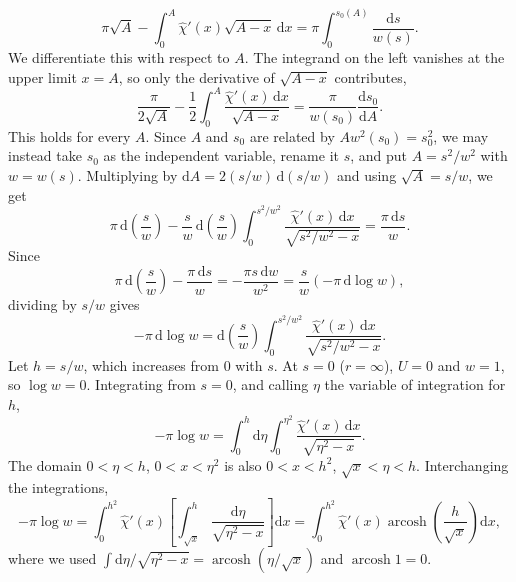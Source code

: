 \begin{problem}[title={Repulsive field from cross-section (Firsov)}]
{\begin{equation*}
    \pi\sqrt{A} - \int_0^A \widehat{\chi}'(x)\sqrt{A - x}\,\mathrm{d}x = \pi\int_0^{s_0(A)} \frac{\mathrm{d}s}{w(s)}.
\end{equation*}
We differentiate this with respect to $A$. The integrand on the left vanishes at the upper limit $x = A$, so only the derivative of $\sqrt{A - x}$ contributes,
\begin{equation*}
    \frac{\pi}{2\sqrt{A}} - \frac{1}{2}\int_0^A \frac{\widehat{\chi}'(x)\,\mathrm{d}x}{\sqrt{A - x}} = \frac{\pi}{w(s_0)}\frac{\mathrm{d}s_0}{\mathrm{d}A}.
\end{equation*}
This holds for every $A$. Since $A$ and $s_0$ are related by $Aw^2(s_0) = s_0^2$, we may instead take $s_0$ as the independent variable, rename it $s$, and put $A = s^2/w^2$ with $w = w(s)$. Multiplying by $\mathrm{d}A = 2(s/w)\,\mathrm{d}(s/w)$ and using $\sqrt{A} = s/w$, we get
\begin{equation*}
    \pi\,\mathrm{d}\left( \frac{s}{w} \right) - \frac{s}{w}\,\mathrm{d}\left( \frac{s}{w} \right) \int_0^{s^2/w^2} \frac{\widehat{\chi}'(x)\,\mathrm{d}x}{\sqrt{s^2/w^2 - x}} = \frac{\pi\,\mathrm{d}s}{w}.
\end{equation*}
Since
\begin{equation*}
    \pi\,\mathrm{d}\left( \frac{s}{w} \right) - \frac{\pi\,\mathrm{d}s}{w} = -\frac{\pi s\,\mathrm{d}w}{w^2} = \frac{s}{w}\left( -\pi\,\mathrm{d}\log{w} \right),
\end{equation*}
dividing by $s/w$ gives
\begin{equation*}
    -\pi\,\mathrm{d}\log{w} = \mathrm{d}\left( \frac{s}{w} \right) \int_0^{s^2/w^2} \frac{\widehat{\chi}'(x)\,\mathrm{d}x}{\sqrt{s^2/w^2 - x}}.
\end{equation*}
Let $h = s/w$, which increases from $0$ with $s$. At $s = 0$ (\ie $r = \infty$), $U = 0$ and $w = 1$, so $\log{w} = 0$. Integrating from $s = 0$, and calling $\eta$ the variable of integration for $h$,
\begin{equation*}
    -\pi\log{w} = \int_0^h \mathrm{d}\eta \int_0^{\eta^2} \frac{\widehat{\chi}'(x)\,\mathrm{d}x}{\sqrt{\eta^2 - x}}.
\end{equation*}
The domain $0 < \eta < h$, $0 < x < \eta^2$ is also $0 < x < h^2$, $\sqrt{x} < \eta < h$. Interchanging the integrations,
\begin{equation*}
    -\pi\log{w} = \int_0^{h^2} \widehat{\chi}'(x) \left[ \int_{\sqrt{x}}^h \frac{\mathrm{d}\eta}{\sqrt{\eta^2 - x}} \right] \mathrm{d}x = \int_0^{h^2} \widehat{\chi}'(x) \operatorname{arcosh}\left( \frac{h}{\sqrt{x}} \right) \mathrm{d}x,
\end{equation*}
where we used $\int \mathrm{d}\eta/\sqrt{\eta^2 - x} = \operatorname{arcosh}(\eta/\sqrt{x})$ and $\operatorname{arcosh}{1} = 0$.

}
\end{problem}
